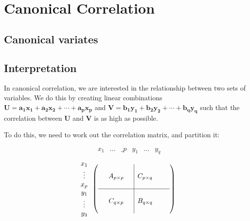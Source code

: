 \chapter{Canonical Correlation}
\label{cancor}

\section{Canonical variates}
\label{canvar}

\section{Interpretation}
\label{canint}

In canonical correlation, we are interested in the relationship between two sets of variables.   We do this by creating linear combinations $\boldsymbol{U} = \boldsymbol{a_{1} x_{1}} + \boldsymbol{a_{2} x_{2}} + \cdots + \boldsymbol{a_{p} x_{p}}$ and  $\boldsymbol{V} = \boldsymbol{b_{1} y_{1}} + \boldsymbol{b_{2} y_{2}} + \cdots + \boldsymbol{b_{q} y_{q}}$ such that the correlation between $\boldsymbol{U}$ and $\boldsymbol{V}$ is as high as possible.


To do this, we need to work out the correlation matrix, and partition it:


\begin{displaymath}
\begin{array}{ccccccc} & x_{1} & \ldots & \_{p} & y_{1} & \ldots & y_{q} \end{array}
\end{displaymath}
\begin{displaymath}
\begin{array}{c} x_{1} \\ \vdots \\ x_{p} \\y_{1} \\ \vdots \\y_{3}\end{array}
\left( \begin{array}{ccc|ccc} &&&&&\\&A_{p \times p}& &C_{p \times q}&\\&&&&&\\
\hline
&&&&&\\&C_{q \times p}& &B_{q \times q}&\\&&&&&\\ \end{array} \right)
\end{displaymath}

